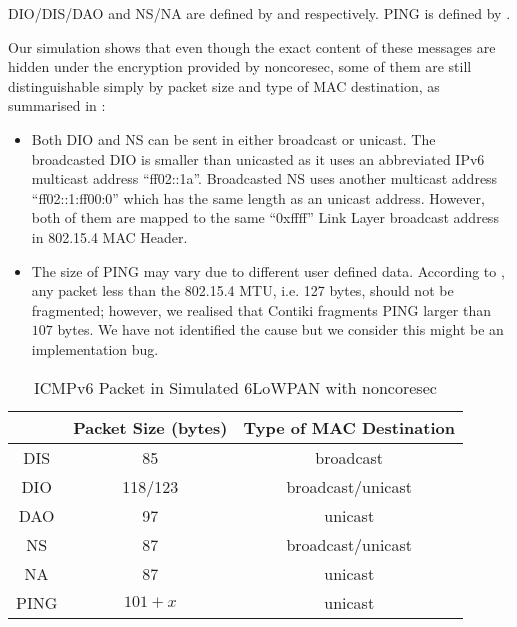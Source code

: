 DIO/DIS/DAO and NS/NA are defined by \cite{rfc6550} and \cite{rfc6775} respectively. PING is defined by \cite{rfc2463}.

Our simulation shows that even though the exact content of these messages are hidden under the encryption provided by noncoresec, some of them are still distinguishable simply by packet size and type of MAC destination, as summarised in :

\begin{itemize}
	\item Both DIO and NS can be sent in either broadcast or unicast. The broadcasted DIO is smaller than unicasted as it uses an abbreviated IPv6 multicast address ``ff02::1a''. Broadcasted NS uses another multicast address ``ff02::1:ff00:0'' which has the same length as an unicast address. However, both of them are mapped to the same ``0xffff'' Link Layer broadcast address in 802.15.4 MAC Header.
	\item The size of PING may vary due to different user defined data. According to \cite{rfc4944}, any packet less than the 802.15.4 MTU, i.e. 127 bytes, should not be fragmented; however, we realised that Contiki fragments PING larger than $107$ bytes. We have not identified the cause but we consider this might be an implementation bug.
\end{itemize}

\begin{table}[ht!]
	\center
	{
		\begin{tabular}{|c|c|c|}
			\hline
			       & Packet Size (bytes) & Type of MAC Destination \\ \hline
			DIS    & 85                  & broadcast                       \\ \hline
			DIO  & 118/123                 & broadcast/unicast                       \\ \hline
			DAO    & 97                  & unicast                      \\ \hline
			NS & 87                  & broadcast/unicast                       \\ \hline
			NA     & 87                  & unicast                      \\ \hline
			PING   & $101+x$               & unicast                      \\ \hline
		\end{tabular}
	}
	\caption{ICMPv6 Packet in Simulated 6LoWPAN with noncoresec}
	\label{ICMPPacketFeature}
\end{table}


